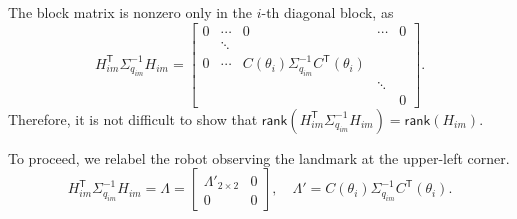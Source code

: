 \documentclass[xcolor=x11names]{article}
\DeclareMathOperator\T{\mathsf{T}}
\begin{document}
     The block matrix is nonzero only in the $i$-th diagonal block, as
    \begin{equation}
       H_{im}^{\T} \Sigma_{q_{im}}^{-1} H_{im} = 
         \begin{bmatrix} 
               0 & \cdots & 0 & \cdots & 0 \\
                 & \ddots & \\
                0 &  \cdots & C(\theta_i) \Sigma_{q_{im}}^{-1} C^{\T}(\theta_i)  \\
               &  &  & \ddots&  \\
               &  &  &  & 0
         \end{bmatrix}.       
    \end{equation}   
   Therefore, it is not difficult to show that $\mathsf{rank}(H_{im}^{\T} \Sigma_{q_{im}}^{-1} H_{im})= \mathsf{rank} (H_{im})$. 
    
   To proceed, we relabel the robot observing the landmark at the upper-left corner.
    \begin{equation}
       H_{im}^{\T} \Sigma_{q_{im}}^{-1} H_{im} = \Lambda =
         \begin{bmatrix} 
            \Lambda'_{2\times 2} & 0\\
             0 & 0
         \end{bmatrix},\quad \Lambda' = C(\theta_i) \Sigma_{q_{im}}^{-1} C^{\T}(\theta_i).
    \end{equation}
    
\end{document}
